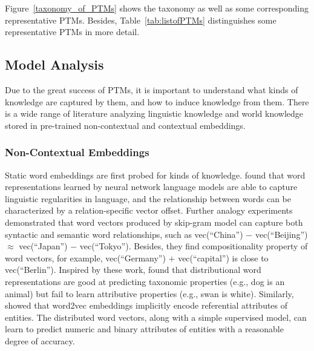 \documentclass[fleqn]{SCYE-arxiv}
\begin{document}
\begin{multicols}{2}
Figure~\ref{taxonomy_of_PTMs} shows the taxonomy as well as some corresponding representative PTMs.
Besides, Table~\ref{tab:listofPTMs} distinguishes some representative PTMs in more detail.







\subsection{Model Analysis}
\label{sec:model-analysis}

Due to the great success of PTMs, it is important to understand what kinds of knowledge are captured by them, and how to induce knowledge from them. There is a wide range of literature analyzing linguistic knowledge and world knowledge stored in pre-trained non-contextual and contextual embeddings.

\subsubsection{Non-Contextual Embeddings}
Static word embeddings are first probed for kinds of knowledge. \citet{mikolov2013ling} found that word representations learned by neural network language models are able to capture linguistic regularities in language, and the relationship between words can be characterized by a relation-specific vector offset. Further analogy experiments \cite{mikolov2013word2vec} demonstrated that word vectors produced by skip-gram model can capture both syntactic and semantic word relationships, such as vec(``China'') $-$ vec(``Beijing'') $\approx$ vec(``Japan'') $-$ vec(``Tokyo''). Besides, they find compositionality property of word vectors, for example, vec(``Germany'') $+$ vec(``capital'') is close to vec(``Berlin''). Inspired by these work, \citet{rubinstein2015how} found that distributional word representations are good at predicting taxonomic properties (e.g., dog is an animal) but fail to learn attributive properties (e.g., swan is white). Similarly, \citet{gupta2015distributional} showed that word2vec embeddings implicitly encode referential attributes of entities. The distributed word vectors, along with a simple supervised model, can learn to predict numeric and binary attributes of entities with a reasonable degree of accuracy.


\end{multicols}
\end{document}
